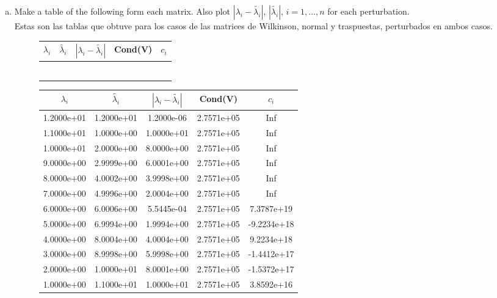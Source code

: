 \documentclass{article}
\begin{document}
\begin{itemize}
\begin{enumerate}[(a)]
\item Make a table of the following form each matrix. Also plot $|\lambda_{i}-\tilde{\lambda_{i}}|$, $|\tilde{\lambda_{i}}|$, $i = 1, \ldots, n$ for each perturbation.\\
Estas son las tablas que obtuve para los casos de las matrices de Wilkinson, normal y traspuestas, perturbados en ambos casos.
\begin{figure}[h!]
\centering
\begin{tabular}{c|c|c|c|c}
$\lambda_{i}$&$\tilde{\lambda_{i}}$ &$|\lambda_{i}-\tilde{\lambda_{i}}|$ &Cond(V) &$c_i$\\
\hline
&&&&\\
\hline
&&&&\\
\hline
&&&&\\
\hline
&&&&\\
\hline
&&&&\\
\hline
&&&&\\
\hline
\end{tabular}
\end{figure}
\begin{figure}[h!]
\centering
\begin{tabular}{c|c|c|c|c}
$\lambda_{i}$&$\tilde{\lambda_{i}}$ &$|\lambda_{i}-\tilde{\lambda_{i}}|$ &Cond(V) &$c_i$\\
\hline
1.2000e+01&1.2000e+01&1.2000e-06&2.7571e+05&Inf\\
\hline
1.1000e+01&1.0000e+00&1.0000e+01&2.7571e+05&Inf\\
\hline
1.0000e+01&2.0000e+00&8.0000e+00&2.7571e+05&Inf\\
\hline
9.0000e+00&2.9999e+00&6.0001e+00&2.7571e+05&Inf\\
\hline
8.0000e+00&4.0002e+00&3.9998e+00&2.7571e+05&Inf\\
\hline
7.0000e+00&4.9996e+00&2.0004e+00&2.7571e+05&Inf\\
\hline
6.0000e+00&6.0006e+00&5.5445e-04&2.7571e+05&7.3787e+19\\
\hline
5.0000e+00&6.9994e+00&1.9994e+00&2.7571e+05&-9.2234e+18\\
\hline
4.0000e+00&8.0004e+00&4.0004e+00&2.7571e+05&9.2234e+18\\
\hline
3.0000e+00&8.9998e+00&5.9998e+00&2.7571e+05&-1.4412e+17\\
\hline
2.0000e+00&1.0000e+01&8.0001e+00&2.7571e+05&-1.5372e+17\\
\hline
1.0000e+00&1.1000e+01&1.0000e+01&2.7571e+05&3.8592e+16\\
\hline


\end{tabular}
\end{figure}
\end{enumerate}
\end{itemize}
\end{document}
